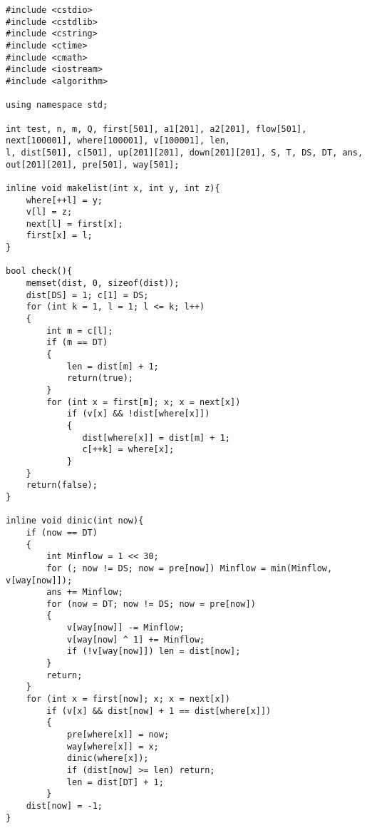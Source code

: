 \begin{lstlisting}
#include <cstdio>
#include <cstdlib>
#include <cstring>
#include <ctime>
#include <cmath>
#include <iostream>
#include <algorithm>

using namespace std;

int test, n, m, Q, first[501], a1[201], a2[201], flow[501], next[100001], where[100001], v[100001], len,
l, dist[501], c[501], up[201][201], down[201][201], S, T, DS, DT, ans, out[201][201], pre[501], way[501];

inline void makelist(int x, int y, int z){
    where[++l] = y;
    v[l] = z;
    next[l] = first[x];
    first[x] = l;
}

bool check(){
    memset(dist, 0, sizeof(dist));
    dist[DS] = 1; c[1] = DS;
    for (int k = 1, l = 1; l <= k; l++)
    {
        int m = c[l];
        if (m == DT)
        {
            len = dist[m] + 1;
            return(true);
        }
        for (int x = first[m]; x; x = next[x])
            if (v[x] && !dist[where[x]])
            {
               dist[where[x]] = dist[m] + 1;
               c[++k] = where[x];
            }
    }
    return(false);
}

inline void dinic(int now){
    if (now == DT)
    {
        int Minflow = 1 << 30;
        for (; now != DS; now = pre[now]) Minflow = min(Minflow, v[way[now]]);
        ans += Minflow;
        for (now = DT; now != DS; now = pre[now])
        {
            v[way[now]] -= Minflow;
            v[way[now] ^ 1] += Minflow;
            if (!v[way[now]]) len = dist[now];
        }
        return;
    }
    for (int x = first[now]; x; x = next[x])
        if (v[x] && dist[now] + 1 == dist[where[x]])
        {
            pre[where[x]] = now;
            way[where[x]] = x;
            dinic(where[x]);
            if (dist[now] >= len) return;
            len = dist[DT] + 1;
        }
    dist[now] = -1;
}


\end{lstlisting}
